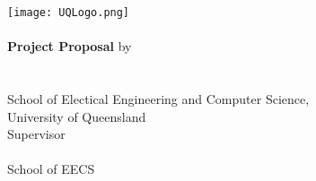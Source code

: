 \begin{titlepage}
	\begin{center}
		\texttt{[image: UQLogo.png]}\\
        \vfill
        \huge \covertext\\
        \Large \textbf{Project Proposal}
        \vfill
		\large by\\
		\vspace{5mm}
		\Large \authortext \\
        \large \studentnotext \\
        \large {}
        \vfill
		\large School of Electical Engineering and Computer Science,\\\smallskip
        \large University of Queensland\\
        \vfill
        \small Supervisor \\
        \vspace{1mm}
        \large \supervisornametext \\
        \small School of EECS \\
        \small \mono{\supervisoremailtext} \\
        \vfill
		\large \proposalduedate
	\end{center}
\end{titlepage}

\thispagestyle{empty}
\newpage
\setcounter{page}{1}
